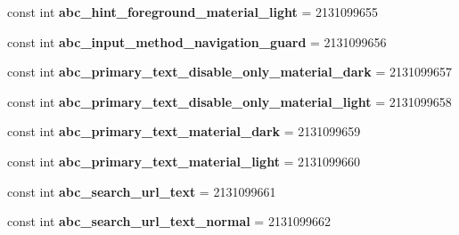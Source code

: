 \begin{DoxyCompactItemize}
\mbox{\label{classst_delivery_1_1_resource_1_1_color_afc1545e4ba2302d8a488827ca3cf0dc5}} 
const int {\bfseries abc\+\_\+hint\+\_\+foreground\+\_\+material\+\_\+light} = 2131099655
\item 
\mbox{\label{classst_delivery_1_1_resource_1_1_color_a95b1b42eab70a644b08dc1d05c6797b5}} 
const int {\bfseries abc\+\_\+input\+\_\+method\+\_\+navigation\+\_\+guard} = 2131099656
\item 
\mbox{\label{classst_delivery_1_1_resource_1_1_color_ad3fa933787f8d27a28caee8473eb7307}} 
const int {\bfseries abc\+\_\+primary\+\_\+text\+\_\+disable\+\_\+only\+\_\+material\+\_\+dark} = 2131099657
\item 
\mbox{\label{classst_delivery_1_1_resource_1_1_color_a93cfc3a2b40cf79d48b99440b01d074b}} 
const int {\bfseries abc\+\_\+primary\+\_\+text\+\_\+disable\+\_\+only\+\_\+material\+\_\+light} = 2131099658
\item 
\mbox{\label{classst_delivery_1_1_resource_1_1_color_a410e20bb8769c2122a50761d6801bea5}} 
const int {\bfseries abc\+\_\+primary\+\_\+text\+\_\+material\+\_\+dark} = 2131099659
\item 
\mbox{\label{classst_delivery_1_1_resource_1_1_color_a32e5a916cc504b5dde0f4df52f828598}} 
const int {\bfseries abc\+\_\+primary\+\_\+text\+\_\+material\+\_\+light} = 2131099660
\item 
\mbox{\label{classst_delivery_1_1_resource_1_1_color_a4f2d32c23ae87b143d371834722b5331}} 
const int {\bfseries abc\+\_\+search\+\_\+url\+\_\+text} = 2131099661
\item 
\mbox{\label{classst_delivery_1_1_resource_1_1_color_a90af6fac0ff0562ca8edb129fb30479a}} 
const int {\bfseries abc\+\_\+search\+\_\+url\+\_\+text\+\_\+normal} = 2131099662
\item 
\mbox{\label{classst_delivery_1_1_resource_1_1_color_adfe8332a0ac07bf35347ca77bdd19b1e}} 

\end{DoxyCompactItemize}
